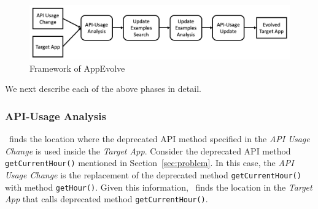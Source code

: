 \begin{figure}[t]
	\centering
	\includegraphics[width=0.8\linewidth]{framework.png}
	\caption{Framework of AppEvolve}
	\label{fig:framework}
\end{figure}

We next describe each of the above phases in detail.
\subsubsection{API-Usage Analysis}
\toolname\ finds the location where the deprecated API method specified in
the {\em API Usage Change} is used inside the {\em Target App}. Consider
the deprecated API method \texttt{getCurrentHour()} mentioned in
Section~\ref{sec:problem}.  In this case, the {\em API Usage Change} is the replacement of the deprecated method \texttt{getCurrentHour()} with method \texttt{getHour()}. Given this information, \toolname\ finds the location in the {\em Target App} that calls deprecated method \texttt{getCurrentHour()}. %
